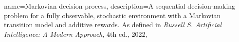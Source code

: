 {
    name={Markovian decision process},
    description={A sequential decision-making problem for a fully observable, stochastic environment 
    with a Markovian transition model and additive rewards. As defined in \textit{Russell S. Artificial Intelligence: A Modern Approach}, 4th ed., 2022},
}


